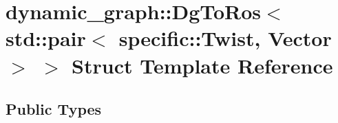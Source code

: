 \hypertarget{structdynamic__graph_1_1DgToRos_3_01std_1_1pair_3_01specific_1_1Twist_00_01Vector_01_4_01_4}{}\section{dynamic\+\_\+graph\+:\+:Dg\+To\+Ros$<$ std\+:\+:pair$<$ specific\+:\+:Twist, Vector $>$ $>$ Struct Template Reference}
\label{structdynamic__graph_1_1DgToRos_3_01std_1_1pair_3_01specific_1_1Twist_00_01Vector_01_4_01_4}
\subsection*{Public Types}
